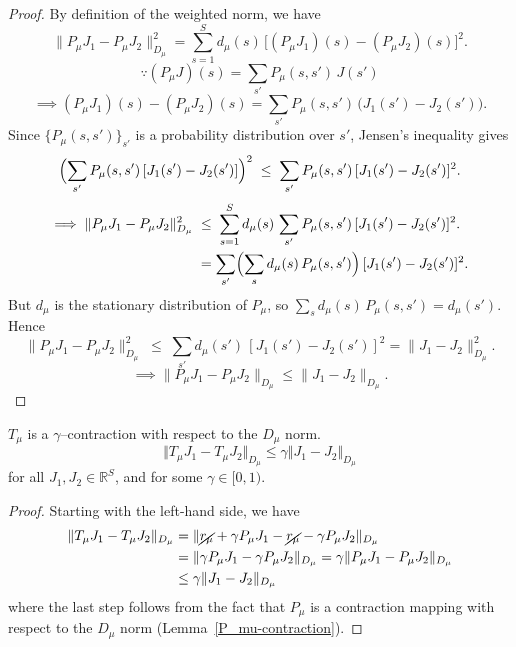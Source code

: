 \begin{proof}
    By definition of the weighted norm, we have
    \[
        \|P_\mu J_{1} - P_\mu J_{2}\|_{D_\mu}^{2}
        =
        \sum_{s=1}^{S} d_\mu(s)\,\bigl[(P_\mu J_{1})(s) - (P_\mu J_{2})(s)\bigr]^{2}.
    \]
    \[
        \because
        (P_\mu J)(s)
        =
        \sum_{s'} P_\mu(s,s')\,J(s')
    \]
    \[
        \implies
        (P_\mu J_{1})(s) - (P_\mu J_{2})(s)
        =
        \sum_{s'} P_\mu(s,s')\,\bigl(J_{1}(s') - J_{2}(s')\bigr).
    \]
    Since \( \{ P_\mu(s,s') \} _{s'}\) is a probability distribution over \(s'\), Jensen’s inequality gives
    \[
        \Bigl(\sum_{s'} P_\mu(s,s')\,[J_{1}(s') - J_{2}(s')]\Bigr)^{2}
        \;\le\;
        \sum_{s'} P_\mu(s,s')\,[J_{1}(s') - J_{2}(s')]^{2}.
    \]
    \begin{align*}
        \implies
        \|P_\mu J_{1} - P_\mu J_{2}\|_{D_\mu}^{2}
        \; & \le\;
        \sum_{s=1}^{S} d_\mu(s)\,\sum_{s'} P_\mu(s,s')\,[J_{1}(s') - J_{2}(s')]^{2}.
        \\ & =
        \sum_{s'}\Bigl(\sum_{s} d_\mu(s)\,P_\mu(s,s')\Bigr)\,[J_{1}(s') - J_{2}(s')]^{2}.
    \end{align*}
    But \(d_\mu\) is the stationary distribution of \(P_\mu\), so \(\sum_{s} d_\mu(s)\,P_\mu(s,s')=d_\mu(s')\).  Hence
    \[
        \|P_\mu J_{1} - P_\mu J_{2}\|_{D_\mu}^{2}
        \;\le\;
        \sum_{s'} d_\mu(s')\,[J_{1}(s') - J_{2}(s')]^{2}
        =
        \|J_{1} - J_{2}\|_{D_\mu}^{2}.
    \]
    \[
        \implies
        \|P_\mu J_{1} - P_\mu J_{2}\|_{D_\mu}
        \le
        \|J_{1} - J_{2}\|_{D_\mu}.
    \]
\end{proof}

\begin{theorem}
    \( T_{\mu} \) is a \( \gamma \)--contraction with respect to the \( D_{\mu} \) norm.
    \[
        \Vert T_{\mu} J_{1} - T_{\mu} J_{2} \Vert_{D_{\mu}} \leq \gamma \Vert J_{1} - J_{2} \Vert_{D_{\mu}}
    \]
    for all \( J_{1}, J_{2} \in \mathbb{R}^{S} \), and for some \( \gamma \in [0, 1) \).
\end{theorem}

\begin{proof}
    Starting with the left-hand side, we have
    \begin{align*}
        \Vert T_{\mu} J_{1} - T_{\mu} J_{2} \Vert_{D_{\mu}}
         & =
        \Vert \cancel{r_{\mu}} + \gamma P_{\mu} J_{1} - \cancel{r_{\mu}} - \gamma P_{\mu} J_{2} \Vert_{D_{\mu}}
        \\
         & =
        \Vert \gamma P_{\mu} J_{1} - \gamma P_{\mu} J_{2} \Vert_{D_{\mu}}
        =
        \gamma \Vert P_{\mu} J_{1} - P_{\mu} J_{2} \Vert_{D_{\mu}}
        \\
         & \leq
        \gamma \Vert J_{1} - J_{2} \Vert_{D_{\mu}}
    \end{align*}
    where the last step follows from the fact that \( P_{\mu} \) is a contraction mapping with respect to the \( D_{\mu} \) norm (Lemma~\ref{P_mu-contraction}).
\end{proof}
